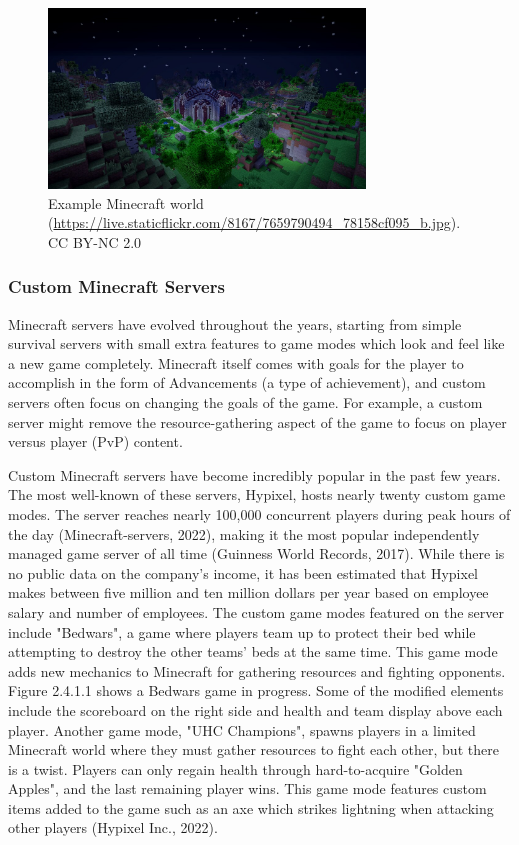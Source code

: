 \documentclass{article}
\begin{document}
\begin{onehalfspacing}
\begin{figure}[h] 
    \centering
    \includegraphics[width=0.75\textwidth]{media/media/image2.jpg} 
    \caption{Example Minecraft world \\ (\href{https://live.staticflickr.com/8167/7659790494_78158cf095_b.jpg}{{https://live.staticflickr.com/8167/7659790494\_78158cf095\_b.jpg}}). CC BY-NC 2.0} 
    \label{fig:2_4_1} 
\end{figure}

\subsubsection{Custom Minecraft Servers}

Minecraft servers have evolved throughout the years, starting from
simple survival servers with small extra features to game modes which
look and feel like a new game completely. Minecraft itself comes with
goals for the player to accomplish in the form of Advancements (a type
of achievement), and custom servers often focus on changing the goals of
the game. For example, a custom server might remove the
resource-gathering aspect of the game to focus on player versus player
(PvP) content.

Custom Minecraft servers have become incredibly popular in the past few
years. The most well-known of these servers, Hypixel, hosts nearly
twenty custom game modes. The server reaches nearly 100,000 concurrent
players during peak hours of the day (Minecraft-servers, 2022), making
it the most popular independently managed game server of all time
(Guinness World Records, 2017). While there is no public data on the
company's income, it has been estimated that Hypixel makes between five
million and ten million dollars per year based on employee salary and
number of employees. The custom game modes featured on the server
include "Bedwars", a game where players team up to protect their bed
while attempting to destroy the other teams' beds at the same time. This
game mode adds new mechanics to Minecraft for gathering resources and
fighting opponents. Figure 2.4.1.1 shows a Bedwars game in progress.
Some of the modified elements include the scoreboard on the right side
and health and team display above each player. Another game mode, "UHC
Champions", spawns players in a limited Minecraft world where they must
gather resources to fight each other, but there is a twist. Players can
only regain health through hard-to-acquire "Golden Apples", and the last
remaining player wins. This game mode features custom items added to the
game such as an axe which strikes lightning when attacking other players
(Hypixel Inc., 2022).


\end{onehalfspacing}
\end{document}

